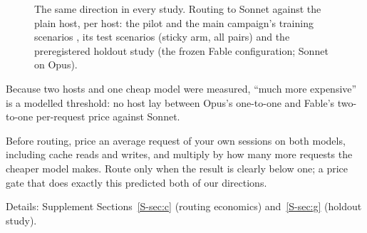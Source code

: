 \begin{table}[tbp]
\centering\small
\caption{Sonnet is half Fable's price per request but Opus's equal. Cost of one average plain-host request at list
prices, its composition, and the routing ratio predicted from the per-request price and the measured request
multiplier \expl.}
\label{tab:perrequest}

\end{table}

\begin{figure}[tbp]
\centering
{}\par\smallskip

\caption{The same direction in every study. Routing to Sonnet against the plain host, per host: the pilot and the
main campaign's training scenarios \expl, its test scenarios (sticky arm, all pairs) and the preregistered holdout
study (the frozen Fable configuration; Sonnet on Opus).}
\label{fig:replication}
\end{figure}

Because two hosts and one cheap model were measured, ``much more expensive'' is a modelled threshold: no host lay
between Opus's one-to-one and Fable's two-to-one per-request price against Sonnet.

\begin{keyidea}[title={For practitioners}]
Before routing, price an average request of your own sessions on both models, including cache reads and writes, and
multiply by how many more requests the cheaper model makes. Route only when the result is clearly below one; a price
gate that does exactly this predicted both of our directions.
\end{keyidea}

Details: Supplement Sections~\ref{S-sec:c} (routing economics) and~\ref{S-sec:g} (holdout study).
